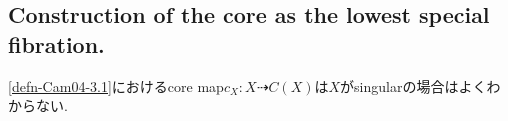 \documentclass[dvipdfmx,a4paper,11pt]{article} %
\newtheorem{thm}{Theorem}[section]
\theoremstyle{definition}
\newtheorem{defn}[thm]{Definition}
\theoremstyle{remark}
\numberwithin{equation}{section}
\begin{document}

\subsection{Construction of the core as the lowest special fibration. \cite[3.1]{Cam04}}
\ref{defn-Cam04-3.1}におけるcore map\(c_X : X \dashrightarrow C(X)\)は$X$がsingularの場合はよくわからない. 
\end{document}
